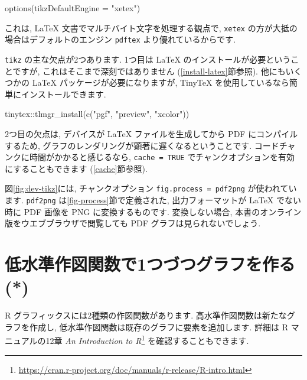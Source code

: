 \documentclass[
  11pt,
]{bxjsreport}
\newenvironment{Shaded}{\begin{snugshade}}{\end{snugshade}}
\newcommand{\AttributeTok}[1]{\textcolor[rgb]{0.77,0.63,0.00}{#1}}
\newcommand{\FunctionTok}[1]{\textcolor[rgb]{0.00,0.00,0.00}{#1}}
\newcommand{\NormalTok}[1]{#1}
\newcommand{\SpecialCharTok}[1]{\textcolor[rgb]{0.00,0.00,0.00}{#1}}
\newcommand{\StringTok}[1]{\textcolor[rgb]{0.31,0.60,0.02}{#1}}
\renewcommand{\href}[2]{#2\footnote{\url{#1}}}
\begin{document}
\begin{Shaded}
\begin{Highlighting}[numbers=left,,]
\FunctionTok{options}\NormalTok{(}\AttributeTok{tikzDefaultEngine =} \StringTok{"xetex"}\NormalTok{)}
\end{Highlighting}
\end{Shaded}

これは, LaTeX 文書でマルチバイト文字を処理する観点で, \texttt{xetex} の方が大抵の場合はデフォルトのエンジン \texttt{pdftex} より優れているからです.

\texttt{tikz} の主な欠点が2つあります. 1つ目は LaTeX のインストールが必要ということですが, これはそこまで深刻ではありません (\ref{install-latex}節参照). 他にもいくつかの LaTeX パッケージが必要になりますが, TinyTeX を使用しているなら簡単にインストールできます.

\begin{Shaded}
\begin{Highlighting}[numbers=left,,]
\NormalTok{tinytex}\SpecialCharTok{::}\FunctionTok{tlmgr\_install}\NormalTok{(}\FunctionTok{c}\NormalTok{(}\StringTok{"pgf"}\NormalTok{, }\StringTok{"preview"}\NormalTok{, }\StringTok{"xcolor"}\NormalTok{))}
\end{Highlighting}
\end{Shaded}

2つ目の欠点は, デバイスが LaTeX ファイルを生成してから PDF にコンパイルするため, グラフのレンダリングが顕著に遅くなるということです. コードチャンクに時間がかかると感じるなら, \texttt{cache = TRUE} でチャンクオプションを有効にすることもできます (\ref{cache}節参照).

図\ref{fig:dev-tikz}には, チャンクオプション \texttt{fig.process = pdf2png} が使われています. \texttt{pdf2png} は\ref{fig-process}節で定義された, 出力フォーマットが LaTeX でない時に PDF 画像を PNG に変換するものです. 変換しない場合, 本書のオンライン版をウエブブラウザで閲覧しても PDF グラフは見られないでしょう.

\hypertarget{low-plots}{%
\section{低水準作図関数で1つづつグラフを作る (*)}\label{low-plots}}

R グラフィックスには2種類の作図関数があります. 高水準作図関数は新たなグラフを作成し, 低水準作図関数は既存のグラフに要素を追加します. 詳細は R マニュアルの12章 \href{https://cran.r-project.org/doc/manuals/r-release/R-intro.html}{\emph{An Introduction to R}} を確認することもできます.
\end{document}
